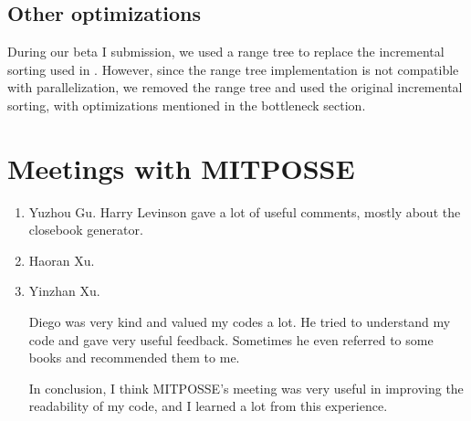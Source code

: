 \documentclass[10pt,twosidep]{article}
\begin{document}
\subsection{Other optimizations}
During our beta I submission, we used a range tree to replace the incremental sorting used in \scs. However, since the range tree implementation is not compatible with parallelization, we removed the range tree and used the original incremental sorting, with optimizations mentioned in the bottleneck section.

\section{Meetings with MITPOSSE}
\begin{enumerate}
	\item Yuzhou Gu.
	Harry Levinson gave a lot of useful comments, mostly about the closebook generator.
	\item Haoran Xu.
	\item Yinzhan Xu.
	
	Diego was very kind and valued my codes a lot. He tried to understand my code and gave very useful feedback. Sometimes he even referred to some books and recommended them to me. 
	
	In conclusion, I think MITPOSSE's meeting was very useful in improving the readability of my code, and I learned a lot from this experience.  
\end{enumerate}
\end{document}
